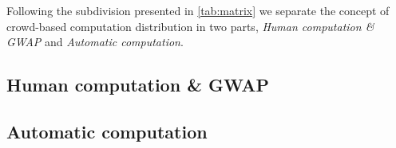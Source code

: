 Following the subdivision presented in \autoref{tab:matrix} we separate the
concept of crowd-based computation distribution in two parts, \emph{Human
computation \& \ac{GWAP}} and \emph{Automatic computation}.

\subsection{Human computation \& \acs{GWAP}}
\label{sec:bg:crowd:human}


\subsection{Automatic computation}
\label{sec:bg:crowd:auto}
